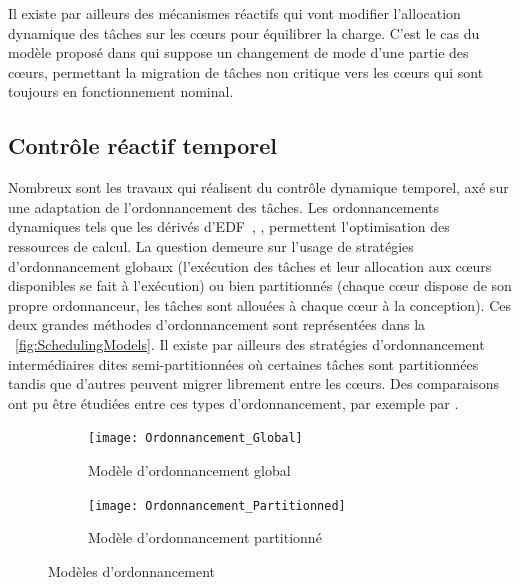 \documentclass[french, a4paper, 11pt, twoside, pdftex]{StyleThese}
\begin{document}
 	Il existe par ailleurs des mécanismes réactifs qui vont modifier l'allocation dynamique des tâches sur les cœurs pour équilibrer la charge. C'est le cas du modèle proposé dans \cite{xu_semi-partitioned_2019} qui suppose un changement de mode d'une partie des cœurs, permettant la migration de tâches non critique vers les cœurs qui sont toujours en fonctionnement nominal.
    
    \subsection{Contrôle réactif temporel}
    Nombreux sont les travaux qui réalisent du contrôle dynamique temporel, axé sur une adaptation de l'ordonnancement des tâches. Les ordonnancements dynamiques tels que les dérivés d'EDF~\cite{lelli_efficient_2011}, \cite{behera_schedulability_2012}, \cite{rodriguez_multicriteria_2013} permettent l'optimisation des ressources de calcul. La question demeure sur l'usage de stratégies d'ordonnancement globaux (l'exécution des tâches et leur allocation aux cœurs disponibles se fait à l'exécution) ou bien partitionnés (chaque cœur dispose de son propre ordonnanceur, les tâches sont allouées à chaque cœur à la conception). Ces deux grandes méthodes d'ordonnancement sont représentées dans la ~\autoref{fig:SchedulingModels}. Il existe par ailleurs des stratégies d'ordonnancement intermédiaires dites semi-partitionnées où certaines tâches sont partitionnées tandis que d'autres peuvent migrer librement entre les cœurs. Des comparaisons ont pu être étudiées entre ces types d'ordonnancement, par exemple par \cite{li_analysis_2014}. 
    \begin{figure}[h!]
    	\centering
    	\begin{subfigure}{.45\textwidth} \centering
    		\texttt{[image: Ordonnancement\_Global]}
    		\caption{Modèle d'ordonnancement global}
    		\label{fig:globalScheduling}
    	\end{subfigure}
    	\begin{subfigure}{.45\textwidth} \centering
    		\texttt{[image: Ordonnancement\_Partitionned]}
    		\caption{Modèle d'ordonnancement partitionné}
    		\label{fig:partitionnedScheduling}
    	\end{subfigure}
    	\caption{Modèles d'ordonnancement}
    	\label{fig:SchedulingModels}
    \end{figure}
        
\end{document}
